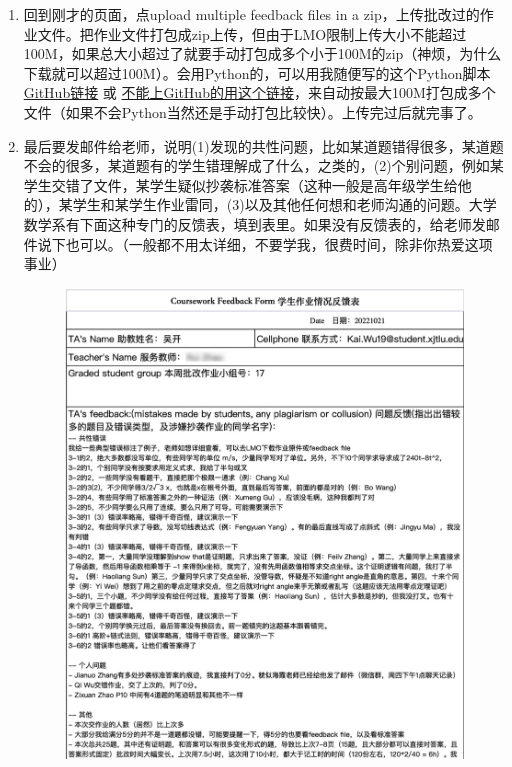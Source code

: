\begin{enumerate}
\begin{figure}[H]
        \end{figure}
    \item 回到刚才的页面，点upload multiple feedback files in a zip，上传批改过的作业文件。把作业文件打包成zip上传，但由于LMO限制上传大小不能超过100M，如果总大小超过了就要手动打包成多个小于100M的zip（神烦，为什么下载就可以超过100M）。会用Python的，可以用我随便写的这个Python脚本 \href{https://github.com/kaiwu-astro/xp_pgrs_unofficial_guide/tree/main/fileshare/zip_in_100M.py}{GitHub链接} 或 \href{https://gitee.com/kaiwu-astro/xp_pgrs_unofficial_guide/tree/main/fileshare}{不能上GitHub的用这个链接}，来自动按最大100M打包成多个文件（如果不会Python当然还是手动打包比较快）。上传完过后就完事了。
    \item 最后要发邮件给老师，说明(1)发现的共性问题，比如某道题错得很多，某道题不会的很多，某道题有的学生错理解成了什么，之类的，(2)个别问题，例如某学生交错了文件，某学生疑似抄袭标准答案（这种一般是高年级学生给他的），某学生和某学生作业雷同，(3)以及其他任何想和老师沟通的问题。大学数学系有下面这种专门的反馈表，填到表里。如果没有反馈表的，给老师发邮件说下也可以。（一般都不用太详细，不要学我，很费时间，除非你热爱这项事业）
        \begin{figure}[H]
            \centering
            \includegraphics[width=0.5\columnwidth]{author-folder/Kai.Wu/LMO_feedback_to_teacher.jpg}
        \end{figure}
\end{enumerate}



